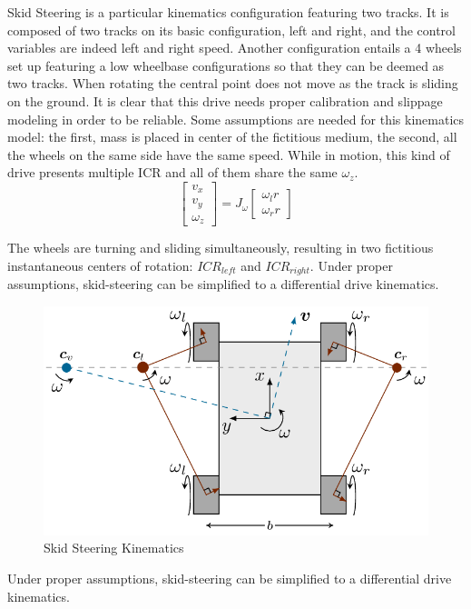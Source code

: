 Skid Steering is a particular kinematics configuration featuring two tracks. It is composed of two tracks on its basic configuration, left and right, and the control variables are indeed left and right speed.
Another configuration entails a 4 wheels set up featuring a low wheelbase configurations so that they can be deemed as two tracks.
When rotating the central point does not move as the track is sliding on the ground. It is clear that this drive needs proper calibration and slippage modeling in order to be reliable.
Some assumptions are needed for this kinematics model: the first, mass is placed in center of the fictitious medium, the second, all the wheels on the same side have the same speed.
While in motion, this kind of drive presents multiple ICR and all of them share the same $\omega_{z}$.
\begin{equation}
\begin{bmatrix}
    v_{x}\\
    v_{y}\\
    \omega_{z}
\end{bmatrix}
= J_{\omega} \begin{bmatrix}
\omega_{l}r\\
\omega_{r}r
\end{bmatrix}\end{equation}

 The wheels are turning and sliding simultaneously, resulting in two fictitious instantaneous centers of rotation: $ICR_{left}$ and $ICR_{right}$.
 Under proper assumptions, skid-steering can be simplified to a differential drive kinematics.
\begin{figure}[H]
    \centering
    \includegraphics[scale=0.40]{Images/Chapter 3/skidsteer2.png}
    \caption{Skid Steering Kinematics}
    \label{fig:skidsteer}
\end{figure}
 Under proper assumptions, skid-steering can be simplified to a differential drive kinematics.
 
